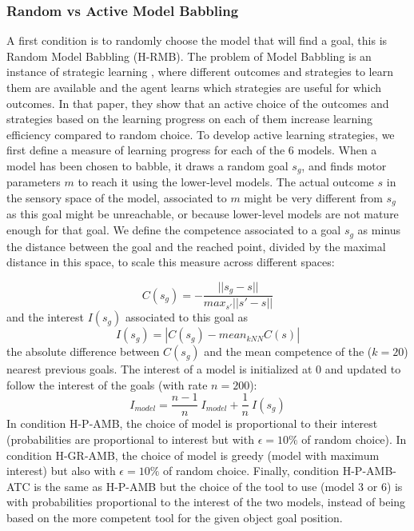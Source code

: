 \documentclass[10pt,letterpaper]{article}
\begin{document}
		
		\subsubsection{Random vs Active Model Babbling}
		
			A first condition is to randomly choose the model that will find a goal, this is Random Model Babbling (H-RMB).
			The problem of Model Babbling is an instance of strategic learning \cite{nguyen2012}, 
			where different outcomes and strategies to learn them are available and the agent learns which strategies are useful for which outcomes.
			In that paper, they show that an active choice of the outcomes and strategies based on the learning progress on each of them increase learning efficiency compared to random choice.
			To develop active learning strategies, we first define a measure of learning progress for each of the $6$ models.
			When a model has been chosen to babble, it draws a random goal $s_g$, and finds motor parameters $m$ to reach it using the lower-level models.
			The actual outcome $s$ in the sensory space of the model, associated to $m$ might be very different from $s_g$ as this goal might be unreachable, or because lower-level models are not mature enough for that goal.
			We define the competence associated to a goal $s_g$ as minus the distance between the goal and the reached point, divided by the maximal distance in this space, to scale this measure across different spaces:
			
			\begin{equation}
				C(s_g)=-\frac{||s_g-s||}{max_{s'}||s'-s||}
			\end{equation}
			 and the interest $I(s_g)$ associated to this goal as 
			\begin{equation}
				I(s_g) = |C(s_g) - mean_{kNN}C(s)|
			\end{equation}
			the absolute difference between $C(s_g)$ and the mean competence of the ($k=20$) nearest previous goals.
			The interest of a model is initialized at $0$ and updated to follow the interest of the goals (with rate $n=200$):
			\begin{equation}
				I_{model}=\frac{n-1}{n}~I_{model} + \frac{1}{n}~I(s_g)
			\end{equation}
			In condition H-P-AMB, the choice of model is proportional to their interest (probabilities are proportional to interest but with $\epsilon=10\%$ of random choice). 
			In condition H-GR-AMB, the choice of model is greedy (model with maximum interest) but also with $\epsilon=10\%$ of random choice.
			Finally, condition H-P-AMB-ATC is the same as H-P-AMB but the choice of the tool to use (model $3$ or $6$) is with probabilities proportional to the interest of the two models, 
			instead of being based on the more competent tool for the given object goal position.
\end{document}
